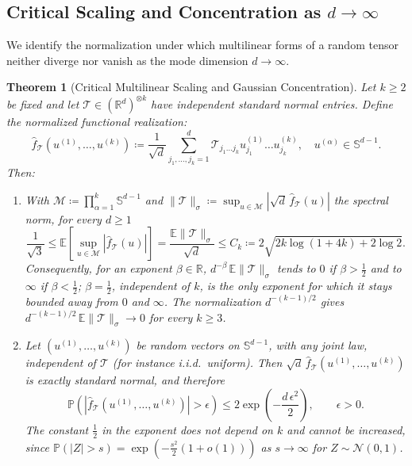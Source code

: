 \documentclass[11pt,a4paper,reqno]{amsart}
\newtheorem{theorem}{Theorem}[section]
\theoremstyle{definition}
\numberwithin{equation}{section}
\newcommand{\R}{\mathbb{R}}
\newcommand{\Sph}{\mathbb{S}}
\begin{document}
\subsection{Critical Scaling and Concentration as \texorpdfstring{$d \to \infty$}{d -> infinity}}
\label{subsec:measure_concentration}

We identify the normalization under which multilinear forms of a random tensor neither diverge nor vanish as the mode dimension $d \to \infty$.

\begin{theorem}[Critical Multilinear Scaling and Gaussian Concentration]
\label{thm:critical_scaling}
Let $k \ge 2$ be fixed and let $\mathcal{T} \in (\R^d)^{\otimes k}$ have independent standard normal entries. Define the normalized functional realization:
\begin{equation}
    \label{eq:renorm_tensor_form}
    \widehat{f}_{\mathcal{T}}(u^{(1)}, \dots, u^{(k)}) \coloneqq \frac{1}{\sqrt{d}} \sum_{j_1, \dots, j_k = 1}^d \mathcal{T}_{j_1 \dots j_k} u_{j_1}^{(1)} \dots u_{j_k}^{(k)}, \quad u^{(\alpha)} \in \Sph^{d-1}.
\end{equation}
Then:
\begin{enumerate}[label=(\roman*)]
    \item With $\mathcal{M} \coloneqq \prod_{\alpha=1}^k \Sph^{d-1}$ and $\|\mathcal{T}\|_\sigma \coloneqq \sup_{u \in \mathcal{M}} |\sqrt{d}\, \widehat{f}_{\mathcal{T}}(u)|$ the spectral norm, for every $d \ge 1$
    \begin{equation}
        \label{eq:two_sided}
        \frac{1}{\sqrt{3}} \le \mathbb{E}\left[ \sup_{u \in \mathcal{M}} |\widehat{f}_{\mathcal{T}}(u)| \right] = \frac{\mathbb{E}\|\mathcal{T}\|_\sigma}{\sqrt{d}} \le C_k \coloneqq 2\sqrt{2k \log(1 + 4k) + 2\log 2}.
    \end{equation}
    Consequently, for an exponent $\beta \in \R$, $d^{-\beta}\, \mathbb{E}\|\mathcal{T}\|_\sigma$ tends to $0$ if $\beta > \frac12$ and to $\infty$ if $\beta < \frac12$; $\beta = \frac12$, independent of $k$, is the only exponent for which it stays bounded away from $0$ and $\infty$. The normalization $d^{-(k-1)/2}$ gives $d^{-(k-1)/2}\,\mathbb{E}\|\mathcal{T}\|_\sigma \to 0$ for every $k \ge 3$.
    \item Let $(u^{(1)}, \dots, u^{(k)})$ be random vectors on $\Sph^{d-1}$, with any joint law, independent of $\mathcal{T}$ (for instance i.i.d.\ uniform). Then $\sqrt{d}\,\widehat{f}_{\mathcal{T}}(u^{(1)}, \dots, u^{(k)})$ is exactly standard normal, and therefore
    \begin{equation}
        \label{eq:concentration_inequality}
        \mathbb{P}\left( |\widehat{f}_{\mathcal{T}}(u^{(1)}, \dots, u^{(k)})| > \epsilon \right) \le 2 \exp\left( - \frac{d \, \epsilon^2}{2} \right), \qquad \epsilon > 0.
    \end{equation}
    The constant $\frac12$ in the exponent does not depend on $k$ and cannot be increased, since $\mathbb{P}(|Z| > s) = \exp(-\frac{s^2}{2}(1+o(1)))$ as $s \to \infty$ for $Z \sim \mathcal{N}(0,1)$.
\end{enumerate}
\end{theorem}
\end{document}
